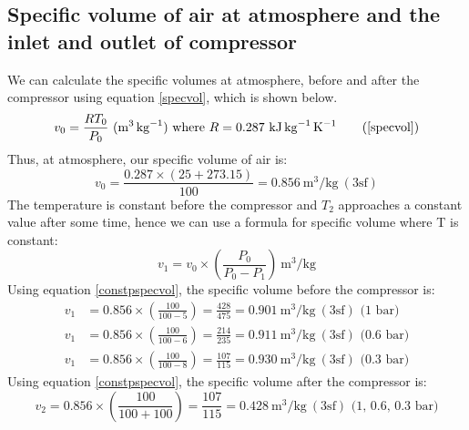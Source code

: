 \documentclass[class=article, crop=false, 12pt,a4paper]{standalone}
\numberwithin{equation}{section}
\begin{document}
\subsection{Specific volume of air at atmosphere and the inlet and outlet of compressor}
We can calculate the specific volumes at atmosphere, before and after the compressor using equation \ref{specvol}, which is shown below.
\begin{equation}
  v_0 = \frac{RT_0}{P_0} \ (\si{\meter\cubed\per\kg}) \textrm{ where \(R = 0.287 \ \si{\kilo\joule\per\kg\per\kelvin}\)}
  \tag{\ref{specvol}}
\end{equation}
Thus, at atmosphere, our specific volume of air is:
\begin{equation} 
  v_0 = \frac{0.287 \times (25+273.15)}{100} = 0.856 \ \si{\meter\cubed\per\kg} \ (3\textrm{sf}) 
\end{equation}
The temperature is constant before the compressor and \(T_2\) approaches a constant value after some time, hence we can use a formula for specific volume where T is constant:
\begin{equation}
  v_1 = v_0 \times \left( \frac{P_0}{P_0 - P_1} \right) \ \si{\meter\cubed\per\kg}
  \label{constpspecvol}
\end{equation}
Using equation \ref{constpspecvol}, the specific volume before the compressor is:
\begin{align} 
  v_1 &= 0.856 \times \left( \frac{100}{100-5} \right) = \frac{428}{475} = 0.901 \ \si{\meter\cubed\per\kg} \ (3\textrm{sf}) \textrm{ (1 bar)} \\
  v_1 &= 0.856 \times \left( \frac{100}{100-6} \right) = \frac{214}{235} = 0.911 \ \si{\meter\cubed\per\kg} \ (3\textrm{sf}) \textrm{ (0.6 bar)} \\
  v_1 &= 0.856 \times \left( \frac{100}{100-8} \right) = \frac{107}{115} = 0.930 \ \si{\meter\cubed\per\kg} \ (3\textrm{sf}) \textrm{ (0.3 bar)} 
\end{align}
Using equation \ref{constpspecvol}, the specific volume after the compressor is:
\begin{equation} v_2 = 0.856 \times \left( \frac{100}{100+100} \right) = \frac{107}{115} = 0.428 \ \si{\meter\cubed\per\kg} \ (3\textrm{sf}) \textrm{ (1, 0.6, 0.3 bar)} \end{equation}
\end{document}
